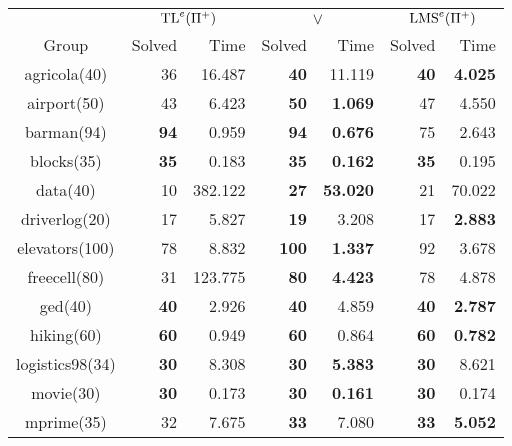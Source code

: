 \newpage
\begin{center}
  \begin{tabular}{c rr rr rr}
    \toprule
    & \multicolumn{2}{c}{$\mbox{TL}^e(\Pi^+)$} & \multicolumn{2}{c}{$\vee$} & \multicolumn{2}{c}{$\mbox{LMS}^e(\Pi^+)$} \\
    \cmidrule(lr){2-3} \cmidrule(lr){4-5} \cmidrule(lr){6-7}
    Group & Solved & Time & Solved & Time & Solved & Time \\
    \midrule
    agricola(40)    & 36            & 16.487            & \textbf{40}   & 11.119              & \textbf{40}     & \textbf{4.025}\\
    airport(50)     & 43            & 6.423             & \textbf{50}   & \textbf{1.069}      & 47              & 4.550\\
    barman(94)      & \textbf{94}   & 0.959             & \textbf{94}   & \textbf{0.676}      & 75              & 2.643 \\
    blocks(35)      & \textbf{35}   & 0.183             & \textbf{35}   & \textbf{0.162}      & \textbf{35}     & 0.195 \\
    data(40)        & 10            & 382.122           & \textbf{27}   & \textbf{53.020}     & 21              & 70.022 \\
    driverlog(20)   & 17            & 5.827             & \textbf{19}   & 3.208               & 17              & \textbf{2.883} \\
    elevators(100)  & 78            & 8.832             & \textbf{100}  & \textbf{1.337}      & 92              & 3.678 \\
    freecell(80)    & 31            & 123.775           & \textbf{80}   & \textbf{4.423}      & 78              & 4.878 \\
    ged(40)         & \textbf{40}   & 2.926             & \textbf{40}   & 4.859               & \textbf{40}     & \textbf{2.787} \\
    hiking(60)      & \textbf{60}   & 0.949             & \textbf{60}   & 0.864               & \textbf{60}     & \textbf{0.782} \\
    logistics98(34) & \textbf{30}   & 8.308             & \textbf{30}   & \textbf{5.383}      & \textbf{30}     & 8.621 \\
    movie(30)       & \textbf{30}   & 0.173             & \textbf{30}   & \textbf{0.161}      & \textbf{30}     & 0.174 \\
    mprime(35)      & 32            & 7.675             & \textbf{33}   & 7.080               & \textbf{33}     & \textbf{5.052} \\

\end{tabular}
\end{center}
